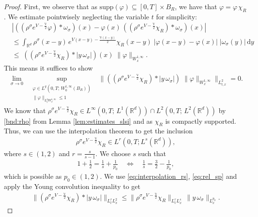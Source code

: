 \documentclass[reqno, 11pt]{amsart}
\numberwithin{equation}{section}
\theoremstyle{definition}
\begin{document}
\begin{proof}
    First, we observe that as $\mathrm{supp}(\varphi)\subseteq [0,T]\times B_R$, we have that $\varphi=\varphi\,\chi_R$. We estimate pointwisely neglecting the variable $t$ for simplicity:
    \begin{align*}
        &|((\rho^\sigma e^{V-\frac{\mathbb{V}}{2}}\varphi)\ast\omega_\sigma)(x)
        -\varphi(x)\,((\rho^\sigma e^{V-\frac{\mathbb{V}}{2}}\chi_R)\ast\omega_\sigma)(x)|\\
        &\leq \int_{\mathbb{R}^{d}} \rho^\sigma(x-y)\, e^{V(x-y)-\frac{\mathbb{V}(x-y)}{2}}\chi_R(x-y)\;|\varphi(x-y)-\varphi(x)|\;|\omega_\sigma(y)| \,\mathrm{d} y\\
        &\leq
        \; ((\rho^\sigma e^{V-\frac{\mathbb{V}}{2}}\chi_R)\ast |y\,\omega_\sigma|)(x)\;\|\varphi\|_{W_x^{1,\infty}} .
    \end{align*}
    This means it suffices to show
    \begin{align}
        \label{eq:goal_comm_slsi}
        \lim_{\sigma\to 0}\;\; \sup_{\substack{\varphi\in L^q(0,T;\, W_0^{1,\infty}(B_R)) \\ \|\varphi\|_{ L_t^q W_x^{1,\infty}}\leq 1}}\;\; \|((\rho^\sigma e^{V-\frac{\mathbb{V}}{2}}\chi_R)\ast|y\,\omega_\sigma|)\;\|\varphi\|_{W_x^{1,\infty}}\|_{L_{t,x}^2}=0.
    \end{align}
    We know that $\rho^\sigma e^{V-\frac{\mathbb{V}}{2}}\chi_R\in L^\infty(0,T;\,L^1(\mathbb{R}^{d}))\cap L^2(0,T;\,L^2(\mathbb{R}^{d}))$ by \ref{bnd:rho} from Lemma \ref{lem:estimates_slsi} and as $\chi_R$ is compactly supported. Thus, we can use the interpolation theorem to get the inclusion \begin{align}
    \label{eq:interpolation_rs}
    \rho^\sigma e^{V-\frac{\mathbb{V}}{2}}\chi_R\in L^r(0,T;L^s(\mathbb R^d)),
\end{align}
where $s\in (1,2)$ and $r=\frac{s}{s-1}$. We choose $s$ such that
\begin{align}
    \label{eq:rel_sp}
    1+\frac{1}{2}
    =\frac{1}{s}+\frac{1}{p_0}
    \quad
    \Leftrightarrow
    \quad
    \frac{1}{s}=\frac{3}{2}-\frac{1}{p_0},
\end{align}
which is possible as $p_0\in (1,2)$. We use \eqref{eq:interpolation_rs},  \eqref{eq:rel_sp} and apply the Young convolution inequality to get
\begin{align*}
    \|(\rho^\sigma e^{V-\frac{\mathbb{V}}{2}}\chi_R)\ast |y\,\omega_\sigma|\|_{L^r_tL^2_x}\le \|\rho^\sigma e^{V-\frac{\mathbb{V}}{2}}\chi_R\|_{L^r_tL^s_x}\,\|y\,\omega_\sigma\|_{L^{p_0}_x}.

\end{align*}
\end{proof}
\end{document}
